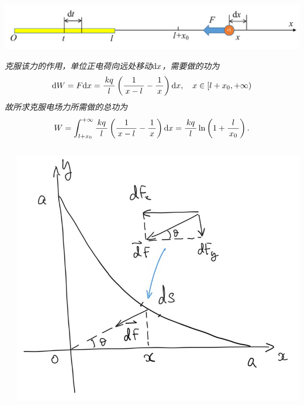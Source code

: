 \begin{frame}
	\linespread{1.5}
	\pause
	
	\begin{center}
		\includegraphics[width=.9\textwidth]{./images/ch6/eMove.pdf}
	\end{center}
	\small \it
	克服该力的作用，单位正电荷向远处移动$\mathrm{d} x$，需要做的功为
	$$\mathrm{d} W=F\mathrm{d} x=\displaystyle\frac{\,{kq}\,}{\,{l}\,}\left(\displaystyle\frac{\,{1}\,}{\,{x-l}\,}-\displaystyle\frac{\,{1}\,}{\,{x}\,}\right)\mathrm{d} x,
	\quad x\in[l+x_0,+\infty)$$
	故所求克服电场力所需做的总功为
	$$W=\displaystyle\int_{l+x_0}^{+\infty}\displaystyle\frac{\,{kq}\,}{\,{l}\,}\left(\displaystyle\frac{\,{1}\,}{\,{x-l}\,}-\displaystyle\frac{\,{1}\,}{\,{x}\,}\right)\mathrm{d} x
	=\displaystyle\frac{\,{kq}\,}{\,{l}\,}\ln\left(1+\displaystyle\frac{\,{l}\,}{\,{x_0}\,}\right).$$
\end{frame}

\begin{frame}
	\linespread{2}
	\begin{columns}
		\begin{column}{.4\textwidth}
		\end{column}
		\begin{column}{.6\textwidth}
			\begin{center}
				\includegraphics[width=.9\textwidth]{./images/ch6/starGr.jpg}
			\end{center}
		\end{column}
	\end{columns}
\end{frame}

